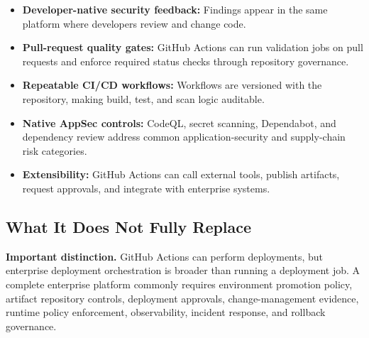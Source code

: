 \documentclass[11pt]{article}
\begin{document}
\begin{itemize}
  \item \textbf{Developer-native security feedback:} Findings appear in the same platform where developers review and change code.
  \item \textbf{Pull-request quality gates:} GitHub Actions can run validation jobs on pull requests and enforce required status checks through repository governance.
  \item \textbf{Repeatable CI/CD workflows:} Workflows are versioned with the repository, making build, test, and scan logic auditable.
  \item \textbf{Native AppSec controls:} CodeQL, secret scanning, Dependabot, and dependency review address common application-security and supply-chain risk categories.
  \item \textbf{Extensibility:} GitHub Actions can call external tools, publish artifacts, request approvals, and integrate with enterprise systems.
\end{itemize}

\subsection{What It Does Not Fully Replace}

\begin{cautionbox}
\textbf{Important distinction.} GitHub Actions can perform deployments, but enterprise deployment orchestration is broader than running a deployment job. A complete enterprise platform commonly requires environment promotion policy, artifact repository controls, deployment approvals, change-management evidence, runtime policy enforcement, observability, incident response, and rollback governance.
\end{cautionbox}
\end{document}
